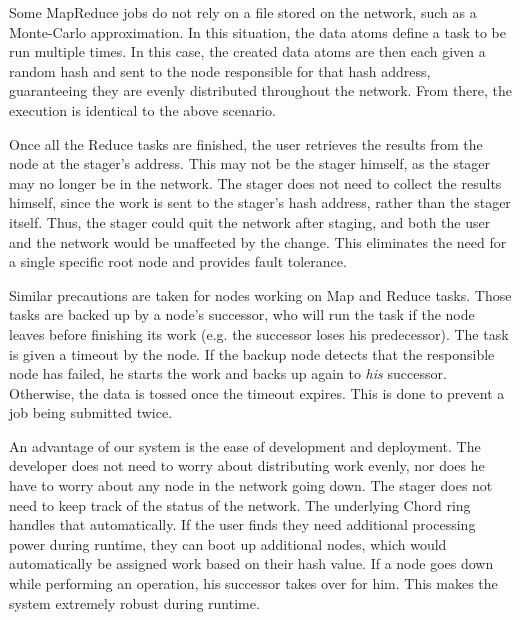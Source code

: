 Some MapReduce jobs do not rely on a file stored on the network, such as a Monte-Carlo approximation.
In this situation, the data atoms define a task to be run multiple times.
In this case, the created data atoms are then each given a random hash and sent to the node responsible for that hash address, guaranteeing they are evenly distributed throughout the network.
From there, the execution is identical to the above scenario.



Once all the Reduce tasks are finished, the user retrieves the results from the node at the stager's address.
This may not be the stager himself, as the stager may no longer be in the network.
The stager does not need to collect the results himself, since the work is sent to the stager's hash address, rather than the stager itself.
Thus, the stager could quit the network after staging, and both the user and the network would be unaffected by the change.
This eliminates the need for a single specific root node and provides fault tolerance.

Similar precautions are taken for nodes working on Map and Reduce tasks.
Those tasks are backed up by a node's successor, who will run the task if the node leaves before finishing its work (e.g. the successor loses his predecessor).
The task is given a timeout by the node.
If the backup node detects that the responsible node has failed, he starts the work and backs up again to \emph{his} successor.
Otherwise, the data is tossed once the timeout expires.
This is done to prevent a job being submitted twice.

An advantage of our system is the ease of development and deployment.
The developer does not need to worry about distributing work evenly, nor does he have to worry about any node in the network going down.
The stager does not need to keep track of the status of the network.
The underlying Chord ring handles that automatically.
If the user finds they need additional processing power during runtime, they can boot up additional nodes, which would automatically be assigned work based on their hash value.
If a node goes down while performing an operation, his successor takes over for him.
This makes the system extremely robust during runtime.



